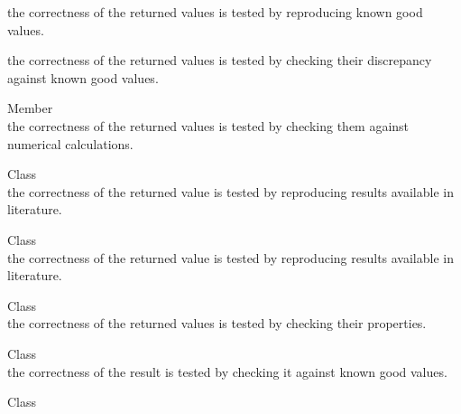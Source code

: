 \begin{DoxyRefList}
\begin{DoxyItemize}
\item the correctness of the returned values is tested by reproducing known good values.
\item the correctness of the returned values is tested by checking their discrepancy against known good values. 
\end{DoxyItemize}
\item[Member \doxylink{namespace_quant_lib_ae2e788da35d2b866040a03b96227ee6e}{Quant\+Lib\+::Statistics} ]\hfill \\
\label{test__test000080}%
%
the correctness of the returned values is tested by checking them against numerical calculations.  
\item[Class \doxylink{class_quant_lib_1_1_stulz_engine}{Quant\+Lib\+::Stulz\+Engine} ]\hfill \\
\label{test__test000116}%
%
the correctness of the returned value is tested by reproducing results available in literature.  
\item[Class \doxylink{class_quant_lib_1_1_suo_wang_double_barrier_engine}{Quant\+Lib\+::Suo\+Wang\+Double\+Barrier\+Engine} ]\hfill \\
\label{test__test000007}%
%
the correctness of the returned value is tested by reproducing results available in literature.  
\item[Class \doxylink{class_quant_lib_1_1_s_v_d}{Quant\+Lib\+::SVD} ]\hfill \\
\label{test__test000052}%
%
the correctness of the returned values is tested by checking their properties.  
\item[Class \doxylink{class_quant_lib_1_1_svi_smile_section}{Quant\+Lib\+::Svi\+Smile\+Section} ]\hfill \\
\label{test__test000016}%
%
the correctness of the result is tested by checking it against known good values.  
\item[Class \doxylink{class_quant_lib_1_1_swaption}{Quant\+Lib\+::Swaption} ]\hfill \\
\label{test__test000025}%
%


\end{DoxyRefList}
